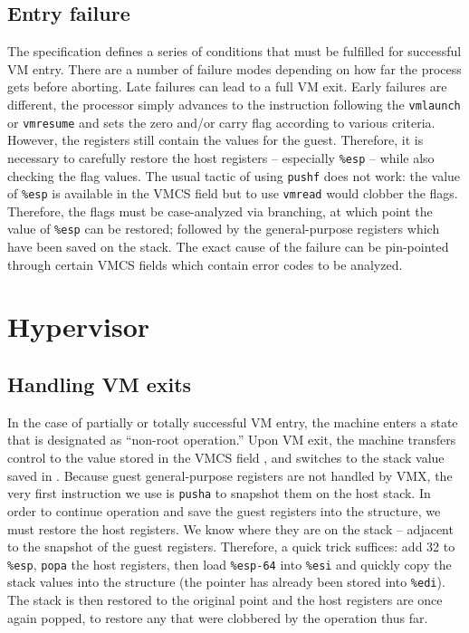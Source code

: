 \documentclass[twocolumn]{article}
\newcommand\type[1]{{\path {#1}}}
\newcommand\defn[1]{{\path {#1}}}
\newcommand\inst[1]{{\tt {#1}}}
\newcommand\reg[1]{{\tt {\%{#1}}}}
\begin{document}
\subsection{Entry failure}
The specification defines a series of conditions that must be
fulfilled for successful VM entry.  There are a number of failure
modes depending on how far the process gets before aborting.  Late
failures can lead to a full VM exit.  Early failures are different,
the processor simply advances to the instruction following the
\inst{vmlaunch} or \inst{vmresume} and sets the zero and/or carry flag
according to various criteria.  However, the registers still contain
the values for the guest.  Therefore, it is necessary to carefully
restore the host registers -- especially \reg{esp} -- while also
checking the flag values.  The usual tactic of using \inst{pushf} does
not work: the value of \reg{esp} is available in the VMCS field
\defn{HOST_RSP} but to use \inst{vmread} would clobber the flags.
Therefore, the flags must be case-analyzed via branching, at which
point the value of \reg{esp} can be restored; followed by the
general-purpose registers which have been saved on the stack.  The
exact cause of the failure can be pin-pointed through certain VMCS
fields which contain error codes to be analyzed.

\section{Hypervisor}
\subsection{Handling VM exits}
In the case of partially or totally successful VM entry, the machine
enters a state that is designated as ``non-root operation.''  Upon VM
exit, the machine transfers control to the value stored in the VMCS
field \defn{HOST_RIP}, and switches to the stack value saved in
\defn{HOST_RSP}.  Because guest general-purpose registers are not
handled by VMX, the very first instruction we use is \inst{pusha} to
snapshot them on the host stack.  In order to continue operation and
save the guest registers into the \type{virtual_machine} structure, we
must restore the host registers.  We know where they are on the stack
-- adjacent to the snapshot of the guest registers.  Therefore, a
quick trick suffices: add 32 to \reg{esp}, \inst{popa} the host
registers, then load \reg{esp-64} into \reg{esi} and quickly copy the
stack values into the structure (the pointer has already been stored
into \reg{edi}).  The stack is then restored to the original point and
the host registers are once again popped, to restore any that were
clobbered by the operation thus far.
\end{document}
